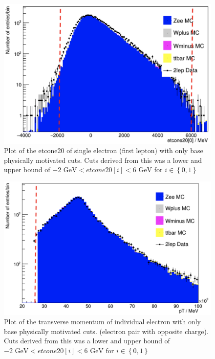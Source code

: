 \documentclass[%
 reprint,
 amsmath,amssymb,
 aps,
]{revtex4-2}
\begin{document}
\begin{figure}
    \centering
    \begin{minipage}{0.4\textwidth}
        \centering
        \includegraphics[width=\linewidth]{plots/etcone_ee_nt.png}
    \end{minipage}
    \caption{Plot of the etcone20 of single electron (first lepton) with only base physically motivated cuts. Cuts derived from this was a lower and upper bound of $ -2\text{ GeV} < etcone20[i] < 6 \text{ GeV for } i \in \left\{ 0,1 \right\}$}
    \label{fig:etcone_ee}
\end{figure}
\begin{figure}
    \centering
    \begin{minipage}{0.4\textwidth}
        \centering
        \includegraphics[width=\linewidth]{plots/pT_ee_nt.png}
    \end{minipage}
    \caption{Plot of the transverse momentum of individual electron with only base physically motivated cuts. (electron pair with opposite charge).  Cuts derived from this was a lower and upper bound of $ -2\text{ GeV} < etcone20[i] < 6 \text{ GeV for } i \in \left\{ 0,1 \right\}$}
    \label{fig:pt_ee}
\end{figure}
\end{document}
